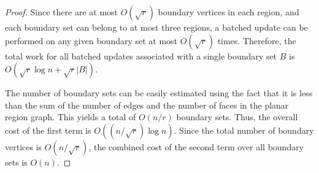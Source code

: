 \begin{proof}
Since there are at most $O(\sqrt{r})$ boundary vertices in each region, and each boundary set can belong to at most three regions, a batched update can be performed on any given boundary set at most $O(\sqrt{r})$ times. Therefore, the total work for all batched updates associated with a single boundary set $B$ is $O(\sqrt{r} \log n + \sqrt{r}|B|)$.

The number of boundary sets can be easily estimated using the fact that it is less than the sum of the number of edges and the number of faces in the planar region graph. This yields a total of $O(n/r)$ boundary sets. Thus, the overall cost of the first term is $O((n/\sqrt{r})\log n)$. Since the total number of boundary vertices is $O(n / \sqrt{r})$, the combined cost of the second term over all boundary sets is $O(n)$.
\end{proof}






